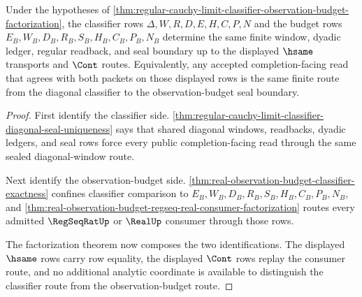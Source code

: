 \begin{theorem}
\label{thm:regular-cauchy-limit-classifier-finite-route-exactness}
Under the hypotheses of \autoref{thm:regular-cauchy-limit-classifier-observation-budget-factorization}, the classifier rows $\Delta,W,R,D,E,H,C,P,N$ and the budget rows $E_B,W_B,D_B,R_B,S_B,H_B,C_B,P_B,N_B$ determine the same finite window, dyadic ledger, regular readback, and seal boundary up to the displayed $\hsame$ transports and $\Cont$ routes. Equivalently, any accepted completion-facing read that agrees with both packets on those displayed rows is the same finite route from the diagonal classifier to the observation-budget seal boundary.
\end{theorem}
\begin{proof}
First identify the classifier side. \autoref{thm:regular-cauchy-limit-classifier-diagonal-seal-uniqueness} says that shared diagonal windows, readbacks, dyadic ledgers, and seal rows force every public completion-facing read through the same sealed diagonal-window route.

Next identify the observation-budget side. \autoref{thm:real-observation-budget-classifier-exactness} confines classifier comparison to $E_B,W_B,D_B,R_B,S_B,H_B,C_B,P_B,N_B$, and \autoref{thm:real-observation-budget-regseq-real-consumer-factorization} routes every admitted $\RegSeqRatUp$ or $\RealUp$ consumer through those rows.

The factorization theorem now composes the two identifications. The displayed $\hsame$ rows carry row equality, the displayed $\Cont$ rows replay the consumer route, and no additional analytic coordinate is available to distinguish the classifier route from the observation-budget route.
\end{proof}

